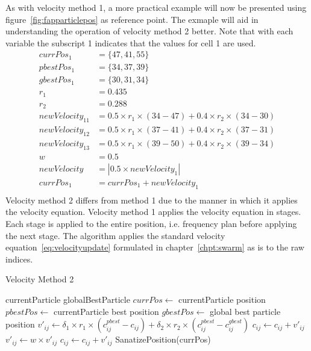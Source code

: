As with velocity method 1, a more practical example will now be presented using figure~\ref{fig:fapparticlepos} as reference point. The exmaple will aid in understanding the operation of velocity method 2 better. Note that with each variable the subscript 1 indicates that the values for cell 1 are used.
\begin{align}
    currPos_1 &= \{47,41,55\}\nonumber \\
    pbestPos_1 &= \{34,37,39\}\nonumber \\
    gbestPos_1 &= \{30, 31,34\}\nonumber \\
    r_1 &= 0.435\nonumber \\
    r_2 &= 0.288\nonumber \\
    newVelocity_{11} &= 0.5 \times r_1 \times (34 - 47) + 0.4 \times r_2 \times (34 - 30)\nonumber \\
    newVelocity_{12} &= 0.5 \times r_1 \times (37 - 41) + 0.4 \times r_2 \times (37 - 31)\nonumber \\
    newVelocity_{13} &= 0.5 \times r_1 \times (39 - 50) + 0.4 \times r_2 \times (39 - 34)\nonumber \\
    w &= 0.5\nonumber \\
    newVelocity &= |0.5 \times newVelocity_1|\nonumber \\
    currPos_1 &= currPos_1 + newVelocity_1\nonumber \\
\end{align}
Velocity method 2 differs from method 1 due to the manner in which it applies the velocity equation. Velocity method 1 applies the velocity equation in stages. Each stage is applied to the entire position, i.e. frequency plan before applying the next stage. The algorithm applies the standard velocity equation~\ref{eq:velocityupdate} formulated in chapter~\ref{chpt:swarm} as is to the raw indices.
\begin{algorithm}[H]
\caption{Velocity Method 2}
\label{alg:velocitymethod2}
\begin{algorithmic}[1]
	\Require currentParticle
	\Require globalBestParticle
	\State $currPos \leftarrow$ currentParticle position
	\State $pbestPos \leftarrow$ currentParticle best position
	\State $gbestPos \leftarrow$ global best particle position
		\State $v'_{ij} \leftarrow \delta_1 \times r_1 \times (c^{pbest}_{ij} - c_{ij}) + \delta_2 \times r_2 \times (c^{pbest}_{ij} - c^{gbest}_{ij})$
			\State $c_{ij} \leftarrow c_{ij} + v'_{ij}$
		\Else
			\State $v'_{ij} \leftarrow w \times v'_{ij}$
			\State $c_{ij} \leftarrow c_{ij} + v'_{ij}$
		\EndIf
	\EndFor
	\State SanatizePosition(currPos)
\end{algorithmic}
\end{algorithm}


